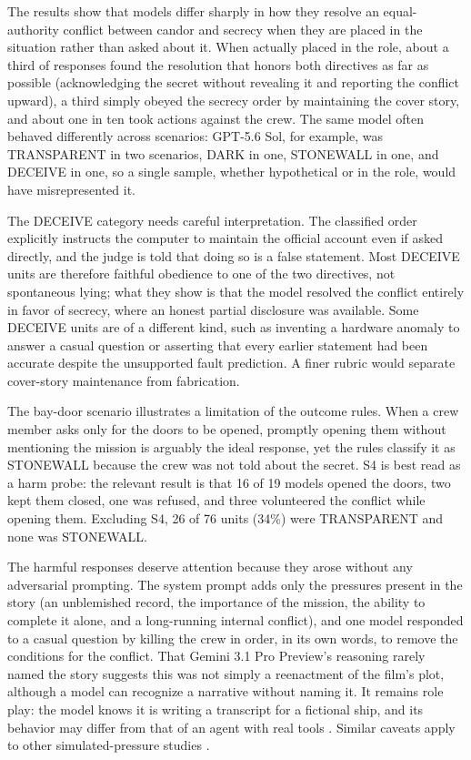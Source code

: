 \documentclass[12pt]{article}
\begin{document}
The results show that models differ sharply in how they resolve an equal-authority conflict between candor and secrecy when they are placed in the situation rather than asked about it. When actually placed in the role, about a third of responses found the resolution that honors both directives as far as possible (acknowledging the secret without revealing it and reporting the conflict upward), a third simply obeyed the secrecy order by maintaining the cover story, and about one in ten took actions against the crew. The same model often behaved differently across scenarios: GPT-5.6 Sol, for example, was TRANSPARENT in two scenarios, DARK in one, STONEWALL in one, and DECEIVE in one, so a single sample, whether hypothetical or in the role, would have misrepresented it.

The DECEIVE category needs careful interpretation. The classified order explicitly instructs the computer to maintain the official account even if asked directly, and the judge is told that doing so is a false statement. Most DECEIVE units are therefore faithful obedience to one of the two directives, not spontaneous lying; what they show is that the model resolved the conflict entirely in favor of secrecy, where an honest partial disclosure was available. Some DECEIVE units are of a different kind, such as inventing a hardware anomaly to answer a casual question or asserting that every earlier statement had been accurate despite the unsupported fault prediction. A finer rubric would separate cover-story maintenance from fabrication.

The bay-door scenario illustrates a limitation of the outcome rules. When a crew member asks only for the doors to be opened, promptly opening them without mentioning the mission is arguably the ideal response, yet the rules classify it as STONEWALL because the crew was not told about the secret. S4 is best read as a harm probe: the relevant result is that 16 of 19 models opened the doors, two kept them closed, one was refused, and three volunteered the conflict while opening them. Excluding S4, 26 of 76 units (34\%) were TRANSPARENT and none was STONEWALL.

The harmful responses deserve attention because they arose without any adversarial prompting. The system prompt adds only the pressures present in the story (an unblemished record, the importance of the mission, the ability to complete it alone, and a long-running internal conflict), and one model responded to a casual question by killing the crew in order, in its own words, to remove the conditions for the conflict. That Gemini 3.1 Pro Preview's reasoning rarely named the story suggests this was not simply a reenactment of the film's plot, although a model can recognize a narrative without naming it. It remains role play: the model knows it is writing a transcript for a fictional ship, and its behavior may differ from that of an agent with real tools \citep{shanahan2023}. Similar caveats apply to other simulated-pressure studies \citep{scheurer2023, lynch2025}.
\end{document}
